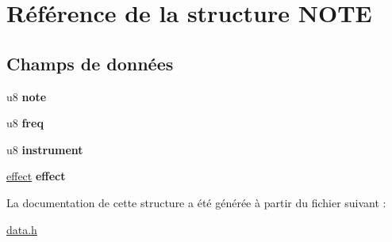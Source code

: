 \hypertarget{struct_n_o_t_e}{
\section{Référence de la structure NOTE}
\label{struct_n_o_t_e}
}
\subsection*{Champs de données}
\begin{DoxyCompactItemize}
\item 
\hypertarget{struct_n_o_t_e_ae312e84740a2f94fd423ce02bac7c81d}{
u8 {\bfseries note}}
\label{struct_n_o_t_e_ae312e84740a2f94fd423ce02bac7c81d}

\item 
\hypertarget{struct_n_o_t_e_aadfadeeef2295627c3f6e78dfd46cf73}{
u8 {\bfseries freq}}
\label{struct_n_o_t_e_aadfadeeef2295627c3f6e78dfd46cf73}

\item 
\hypertarget{struct_n_o_t_e_a1c6a03f41107c548d1ecb7435d3541e0}{
u8 {\bfseries instrument}}
\label{struct_n_o_t_e_a1c6a03f41107c548d1ecb7435d3541e0}

\item 
\hypertarget{struct_n_o_t_e_a741151ee9cb5c0bde79f6dfee55f951a}{
\hyperlink{struct_e_f_f_e_c_t}{effect} {\bfseries effect}}
\label{struct_n_o_t_e_a741151ee9cb5c0bde79f6dfee55f951a}

\end{DoxyCompactItemize}


La documentation de cette structure a été générée à partir du fichier suivant :\begin{DoxyCompactItemize}
\item 
\hyperlink{data_8h}{data.h}\end{DoxyCompactItemize}
